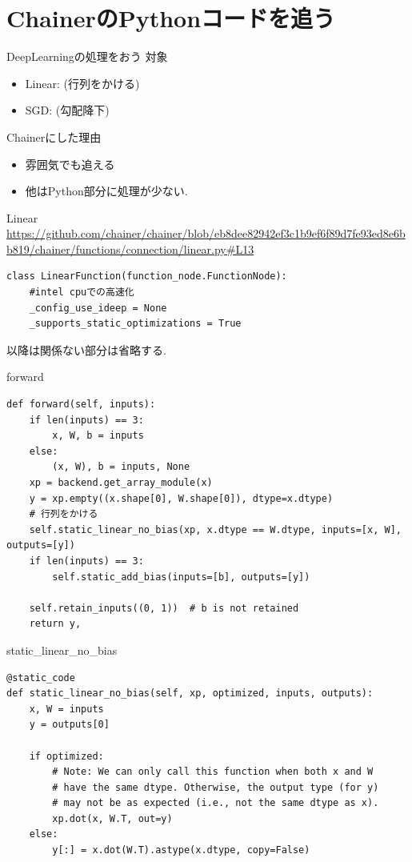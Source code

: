 \section{ChainerのPythonコードを追う}

\begin{frame}[fragile]{DeepLearningの処理をおう}
対象
\begin{itemize}
\item  Linear: (行列をかける)
\item SGD: (勾配降下)
\end{itemize}

Chainerにした理由
\begin{itemize}
\item 雰囲気でも追える
\item 他はPython部分に処理が少ない.
\end{itemize}
\end{frame}


\begin{frame}[fragile]{Linear}
\url{https://github.com/chainer/chainer/blob/eb8dee82942ef3c1b9ef6f89d7fe93ed8e6bb819/chainer/functions/connection/linear.py#L13}

\begin{verbatim}
class LinearFunction(function_node.FunctionNode):
    #intel cpuでの高速化
    _config_use_ideep = None
    _supports_static_optimizations = True
\end{verbatim}
以降は関係ない部分は省略する.
\end{frame}


\begin{frame}[fragile]{forward}
\begin{verbatim}
def forward(self, inputs):
    if len(inputs) == 3:
        x, W, b = inputs
    else:
        (x, W), b = inputs, None
    xp = backend.get_array_module(x)
    y = xp.empty((x.shape[0], W.shape[0]), dtype=x.dtype)
    # 行列をかける
    self.static_linear_no_bias(xp, x.dtype == W.dtype, inputs=[x, W], outputs=[y])
    if len(inputs) == 3:
        self.static_add_bias(inputs=[b], outputs=[y])
    
    self.retain_inputs((0, 1))  # b is not retained
    return y,
\end{verbatim}
\end{frame}
        

\begin{frame}[fragile]{static\_linear\_no\_bias}
\begin{verbatim}
@static_code
def static_linear_no_bias(self, xp, optimized, inputs, outputs):
    x, W = inputs
    y = outputs[0]

    if optimized:
        # Note: We can only call this function when both x and W
        # have the same dtype. Otherwise, the output type (for y)
        # may not be as expected (i.e., not the same dtype as x).
        xp.dot(x, W.T, out=y)
    else:
        y[:] = x.dot(W.T).astype(x.dtype, copy=False)
\end{verbatim}
\end{frame}


